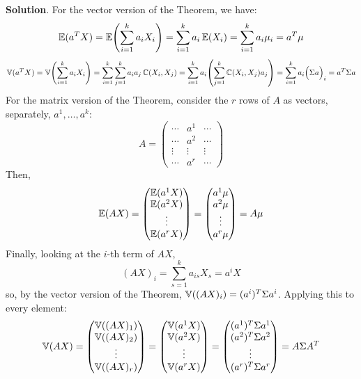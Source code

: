 \textbf{Solution}.
For the vector version of the Theorem, we have:
\[
\EXP(a^T X) = \EXP\left( \sum_{i=1}^{k} a_{i} X_{i} \right) = \sum_{i=1}^{k} a_{i} \EXP(X_{i}) = \sum_{i=1}^{k} a_{i} \mu_{i} = a^T \mu
\]
\[
\VAR(a^T X) = \VAR\left( \sum_{i=1}^{k} a_{i} X_{i} \right) = \sum_{i=1}^{k} \sum_{j=1}^{k} a_{i} a_{j} \COV (X_{i}, X_{j}) = \sum_{i=1}^{k} a_{i} \left( \sum_{j=1}^{k} \COV(X_{i}, X_{j}) a_{j} \right) = \sum_{i=1}^{k} a_{i} \Big( \Sigma a \Big)_{i} = a^T \Sigma a
\]
For the matrix version of the Theorem, consider the \(r\) rows of \(A\)
as vectors, separately, \(a^{1}, \dots, a^{k}\):
\[
A = \begin{pmatrix}
\cdots & a^{1} & \cdots \\
\cdots & a^{2} & \cdots \\
\vdots & \vdots & \vdots \\
\cdots & a^r & \cdots
\end{pmatrix}
\]
Then,
\[
\operatorname{\mathbb{E}}(AX) = \begin{pmatrix}
\operatorname{\mathbb{E}}(a^{1} X) \\
\operatorname{\mathbb{E}}(a^{2} X) \\
\vdots \\
\operatorname{\mathbb{E}}(a^r X)
\end{pmatrix} = \begin{pmatrix}
a^{1} \mu \\
a^{2} \mu \\
\vdots \\
a^r \mu
\end{pmatrix} = A\mu
\]
Finally, looking at the \(i\)-th term of \(AX\),
\[
(AX)_{i} = \sum_{s=1}^{k} a_{is} X_s = a^{i} X
\]
so, by the vector version of the Theorem,
\(\operatorname{\mathbb{V}}((AX)_{i}) = (a^{i})^T \Sigma a^{i}\). Applying this to every
element:
\[
\operatorname{\mathbb{V}}(AX) = \begin{pmatrix}
\operatorname{\mathbb{V}}((AX)_{1}) \\
\operatorname{\mathbb{V}}((AX)_{2}) \\
\vdots \\
\operatorname{\mathbb{V}}((AX)_r)
\end{pmatrix} = \begin{pmatrix}
\operatorname{\mathbb{V}}(a^{1} X) \\
\operatorname{\mathbb{V}}(a^{2} X) \\
\vdots \\
\operatorname{\mathbb{V}}(a^r X)
\end{pmatrix} = \begin{pmatrix}
(a^{1})^T \Sigma a^{1} \\
(a^{2})^T \Sigma a^{2} \\
\vdots \\
(a^r)^T \Sigma a^r
\end{pmatrix} = A \Sigma A^T
\]

